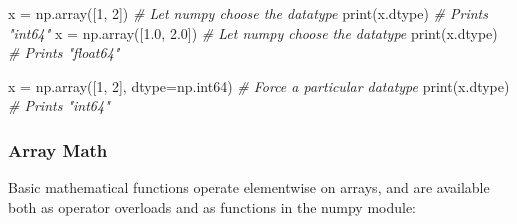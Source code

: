 \documentclass[
]{article}
\newenvironment{Shaded}{}{}
\newcommand{\BuiltInTok}[1]{#1}
\newcommand{\CommentTok}[1]{\textcolor[rgb]{0.38,0.63,0.69}{\textit{#1}}}
\newcommand{\DecValTok}[1]{\textcolor[rgb]{0.25,0.63,0.44}{#1}}
\newcommand{\FloatTok}[1]{\textcolor[rgb]{0.25,0.63,0.44}{#1}}
\newcommand{\NormalTok}[1]{#1}
\newcommand{\OperatorTok}[1]{\textcolor[rgb]{0.40,0.40,0.40}{#1}}
\begin{document}
\begin{Shaded}
\begin{Highlighting}[]
\NormalTok{x }\OperatorTok{=}\NormalTok{ np.array([}\DecValTok{1}\NormalTok{, }\DecValTok{2}\NormalTok{])       }\CommentTok{\# Let numpy choose the datatype}
\BuiltInTok{print}\NormalTok{(x.dtype)             }\CommentTok{\# Prints "int64"}
\NormalTok{x }\OperatorTok{=}\NormalTok{ np.array([}\FloatTok{1.0}\NormalTok{, }\FloatTok{2.0}\NormalTok{])   }\CommentTok{\# Let numpy choose the datatype}
\BuiltInTok{print}\NormalTok{(x.dtype)             }\CommentTok{\# Prints "float64"}

\NormalTok{x }\OperatorTok{=}\NormalTok{ np.array([}\DecValTok{1}\NormalTok{, }\DecValTok{2}\NormalTok{], dtype}\OperatorTok{=}\NormalTok{np.int64)   }\CommentTok{\# Force a particular datatype}
\BuiltInTok{print}\NormalTok{(x.dtype)                         }\CommentTok{\# Prints "int64"}
\end{Highlighting}
\end{Shaded}

\hypertarget{array-math}{%
\subsubsection{Array Math}\label{array-math}}

Basic mathematical functions operate elementwise on arrays, and are
available both as operator overloads and as functions in the numpy
module:
\end{document}
